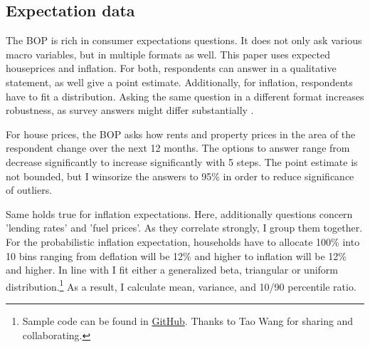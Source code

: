 \documentclass[ProjectABM]{subfiles}
\begin{document}


\subsection{Expectation data}
The BOP is rich in consumer expectations questions. It does not only ask various macro variables, but in multiple formats as well. This paper uses expected houseprices and inflation. For both, respondents can answer in a qualitative statement, as well give a point estimate. Additionally, for inflation, respondents have to fit a distribution. Asking the same question in a different format increases robustness, as survey answers might differ substantially \cite{potter_et_al_2017prob,diercks2021asymmetric}.

For house prices, the BOP asks how rents and property prices in the area of the respondent change over the next 12 months. The options to answer range from decrease significantly to increase significantly with 5 steps. The point estimate is not bounded, but I winsorize the answers to 95\% in order to reduce significance of outliers.

Same holds true for inflation expectations. Here, additionally questions concern 'lending rates' and 'fuel prices'. As they correlate strongly, I group them together. For the probabilistic inflation expectation, households have to allocate 100\% into 10 bins ranging from deflation will be 12\% and higher to inflation will be 12\% and higher. In line with \cite{engelberg_manski_2009distribution} I fit either a generalized beta, triangular or uniform distribution.\footnote{Sample code can be found in \href{https://github.com/AMonninger/DensitySurveyEstimation}{GitHub}. Thanks to Tao Wang for sharing and collaborating.} As a result, I calculate mean, variance, and 10/90 percentile ratio.




\end{document}
